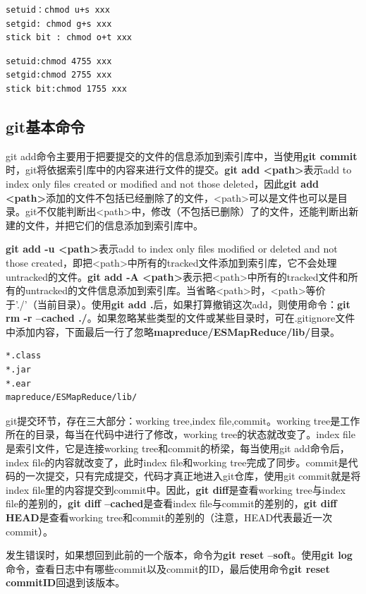 \begin{minipage}{.5\linewidth}
\begin{verbatim}
setuid：chmod u+s xxx
setgid: chmod g+s xxx
stick bit : chmod o+t xxx
\end{verbatim}  
\end{minipage}
\begin{minipage}{.5\linewidth}
\begin{verbatim}
setuid:chmod 4755 xxx
setgid:chmod 2755 xxx
stick bit:chmod 1755 xxx
\end{verbatim}  
\end{minipage}
\subsection{git基本命令}
\par git add命令主要用于把要提交的文件的信息添加到索引库中，当使用\textbf{git commit}时，git将依据索引库中的内容来进行文件的提交。\textbf{git add <path>}表示add to index only files created or modified and not those deleted，因此\textbf{git add <path>}添加的文件不包括已经删除了的文件，<path>可以是文件也可以是目录。git不仅能判断出<path>中，修改（不包括已删除）了的文件，还能判断出新建的文件，并把它们的信息添加到索引库中。
\par \textbf{git add -u <path>}表示add to index only files modified or deleted and not those created，即把<path>中所有的tracked文件添加到索引库，它不会处理untracked的文件。\textbf{git add -A <path>}表示把<path>中所有的tracked文件和所有的untracked的文件信息添加到索引库。当省略<path>时，<path>等价于'./'（当前目录）。使用\textbf{git add .}后，如果打算撤销这次add，则使用命令：\textbf{git rm -r --cached ./}。如果忽略某些类型的文件或某些目录时，可在.gitignore文件中添加内容，下面最后一行了忽略\textbf{mapreduce/ESMapReduce/lib/}目录。
\begin{verbatim}
*.class
*.jar
*.ear
mapreduce/ESMapReduce/lib/
\end{verbatim}
\par git提交环节，存在三大部分：working tree,index file,commit。working tree是工作所在的目录，每当在代码中进行了修改，working tree的状态就改变了。index file是索引文件，它是连接working tree和commit的桥梁，每当使用git add命令后，index file的内容就改变了，此时index file和working tree完成了同步。commit是代码的一次提交，只有完成提交，代码才真正地进入git仓库，使用git commit就是将index file里的内容提交到commit中。因此，\textbf{git diff}是查看working tree与index file的差别的，\textbf{git diff --cached}是查看index file与commit的差别的，\textbf{git diff HEAD}是查看working tree和commit的差别的（注意，HEAD代表最近一次commit）。
\par 发生错误时，如果想回到此前的一个版本，命令为\textbf{git reset --soft}。使用\textbf{git log}命令，查看日志中有哪些commit以及commit的ID，最后使用命令\textbf{git reset commitID}回退到该版本。
